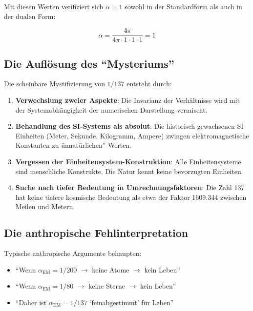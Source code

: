 Mit diesen Werten verifiziert sich $\alpha = 1$ sowohl in der Standardform als auch in der dualen Form:

\begin{equation}
	\alpha = \frac{4\pi}{4\pi \cdot 1 \cdot 1 \cdot 1} = 1
\end{equation}

\subsection{Die Auflösung des ``Mysteriums''}
\label{subsec:mystery_resolution}

Die scheinbare Mystifizierung von $1/137$ entsteht durch:

\begin{enumerate}
	\item \textbf{Verwechslung zweier Aspekte}: Die Invarianz der Verhältnisse wird mit der Systemabhängigkeit der numerischen Darstellung vermischt.
	
	\item \textbf{Behandlung des SI-Systems als absolut}: Die historisch gewachsenen SI-Einheiten (Meter, Sekunde, Kilogramm, Ampere) zwingen elektromagnetische Konstanten zu ünnatürlichen'' Werten.
	
	\item \textbf{Vergessen der Einheitensystem-Konstruktion}: Alle Einheitensysteme sind menschliche Konstrukte. Die Natur kennt keine bevorzugten Einheiten.
	
	\item \textbf{Suche nach tiefer Bedeutung in Umrechnungsfaktoren}: Die Zahl 137 hat keine tiefere kosmische Bedeutung als etwa der Faktor 1609.344 zwischen Meilen und Metern.
\end{enumerate}

\subsection{Die anthropische Fehlinterpretation}
\label{subsec:anthropic_fallacy}

Typische anthropische Argumente behaupten:
\begin{itemize}
	\item ``Wenn $\alpha_{\text{EM}} = 1/200$ $\rightarrow$ keine Atome $\rightarrow$ kein Leben''
	\item ``Wenn $\alpha_{\text{EM}} = 1/80$ $\rightarrow$ keine Sterne $\rightarrow$ kein Leben''
	\item ``Daher ist $\alpha_{\text{EM}} = 1/137$ `feinabgestimmt' für Leben''
\end{itemize}

